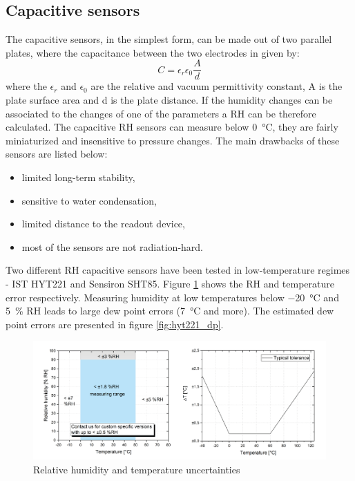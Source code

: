 \subsection{Capacitive sensors}
The capacitive sensors, in the simplest form, can be made out of two parallel plates, where the capacitance between the two electrodes in given by:
\begin{equation}
C = \epsilon_{r}\epsilon_0\frac{A}{d}
\end{equation}
where the $\epsilon_{r}$ and $\epsilon_{0}$ are the relative and vacuum permittivity constant, A is the plate surface area and d is the plate distance. If the humidity changes can be associated to the changes of one of the parameters a \gls{RH} can be therefore calculated. 
The capacitive \gls{RH} sensors can measure below \SI{0}{\celsius}, they are fairly miniaturized and insensitive to pressure changes. The main drawbacks of these sensors are listed below:
\begin{itemize}
    \item limited long-term stability,
    \item sensitive to water condensation,
    \item limited distance to the readout device,
    \item most of the sensors are not radiation-hard.
\end{itemize}
Two different \gls{RH} capacitive sensors have been tested in low-temperature regimes - IST HYT221 and Sensiron SHT85. Figure \ref{fig:hyt221} shows the \gls{RH} and temperature error respectively. Measuring humidity at low temperatures below \SI{-20}{\celsius} and 5~\% \gls{RH} leads to large dew point errors (\SI{7}{\celsius} and more). The estimated dew point errors are presented in figure \ref{fig:hyt221_dp}.
\begin{figure}[!h]
\centering
\includegraphics[width=0.85\columnwidth]{Chapter5/images/hyt221_rh.png}
\caption{Relative humidity and temperature uncertainties \cite{hyt221}}
\label{fig:hyt221}
\end{figure}
